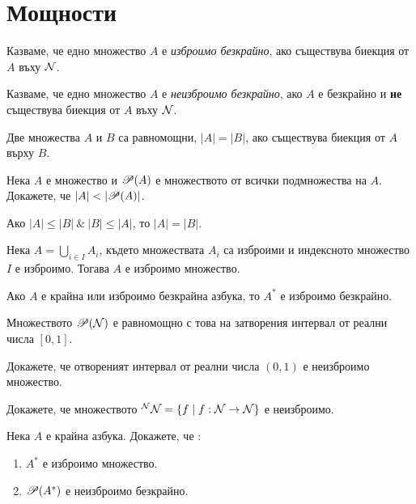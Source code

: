 
\section{Мощности}


Казваме, че едно множество $A$ е {\em изброимо безкрайно}, ако съществува 
биекция от $A$ въху $\mathcal{N}$.

Казваме, че едно множество $A$ е {\em неизброимо безкрайно}, ако $A$ е безкрайно и {\bf не} съществува 
биекция от $A$ въху $\mathcal{N}$.

\begin{dfn}
  Две множества $A$ и $B$ са равномощни, $|A| = |B|$, ако съществува биекция от $A$ върху $B$.
\end{dfn}

\begin{thm}
  Нека $A$ е множество и $\mathscr{P}(A)$ е множеството от всички подмножества на $A$.
  Докажете, че $|A| < |\mathscr{P}(A)|$.
\end{thm}


\begin{thm}\label{KSB}
  Ако $|A|\leq|B|\ \&\ |B|\leq|A|$, то $|A| = |B|$.
\end{thm}

\begin{thm}\label{countable_union}
  Нека $A = \bigcup_{i\in I}A_i$, където множествата $A_i$ са изброими и индексното множество $I$ е изброимо.
  Тогава $A$ е изброимо множество.
\end{thm}
\begin{corollary}
  Ако $A$ е крайна или изброимо безкрайна азбука, то $A^*$ е изброимо безкрайно.
\end{corollary}

\begin{problem}
  Множеството $\mathscr{P}(\mathcal{N})$ е равномощно с това на затворения интервал от реални числа $[0,1]$.
\end{problem}

\begin{problem}
  Докажете, че отвореният интервал от реални числа $(0,1)$ е неизброимо множество.
\end{problem}

\begin{problem}
  Докажете, че множеството $^{\mathcal{N}}\mathcal{N} = \{f\mid f:\mathcal{N}\to\mathcal{N}\}$ е неизброимо.
\end{problem}

\begin{problem}
  Нека $A$ е крайна азбука.
  Докажете, че :
  \begin{enumerate}[1)]
  \item
    $A^*$ е изброимо множество.
  \item
    $\mathscr{P}(A^*)$ е неизброимо безкрайно.
  \end{enumerate}
\end{problem}

